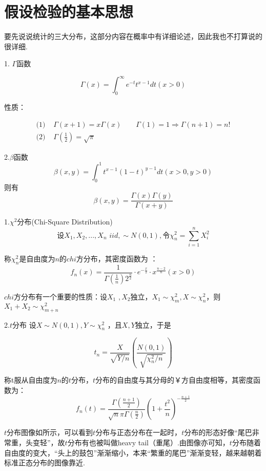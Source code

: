 \section{假设检验的基本思想}

要先说说统计的三大分布，这部分内容在概率中有详细论述，因此我也不打算说的很详细.

1. $\Gamma$函数

$$
\Gamma \left( x \right) =\int_0^{\infty}{e^{-t}t^{x-1}dt\left( x>0 \right)}
$$

性质：

\begin{align*}
    \text{(1) } & \Gamma \left( x+1 \right) =x\Gamma \left( x \right)  \qquad
    \Gamma \left( 1 \right) =1\Rightarrow \Gamma \left( n+1 \right) =n! \\
    \text{(2) } & \Gamma \left( \frac{1}{2} \right) =\sqrt{\pi}
\end{align*}


2.$\beta$函数
$$
\beta \left( x,y \right) =\int_0^1{t^{x-1}\left( 1-t \right) ^{y-1}dt\left( x>0,y>0 \right)}
$$
则有	 
$$
\beta \left( x,y \right) =\frac{\Gamma \left( x \right) \Gamma \left( y \right)}{\Gamma \left( x+y \right)}
$$

1.$\chi ^2$分布(Chi-Square Distribution)
$$
\text{设}X_1, X_2,..., X_n\,\,iid,\sim N\left( 0,1 \right) , \text{令}\chi _{n}^{2}=\sum_{i=1}^n{X_{i}^{2}}
$$

称$\chi _n^2$是自由度为$n$的$chi$方分布，其密度函数为 ：
$$
f_n\left( x \right) =\frac{1}{\Gamma \left( \frac{1}{n} \right) 2^{\frac{n}{2}}}\cdot e^{-\frac{x}{2}}\cdot x^{\frac{n-2}{n}}\left( x>0 \right) 
$$

$chi$方分布有一个重要的性质：设$X_1\,\,,X_2$独立，$X_1\sim \chi _{m}^{2}, X\sim \chi _{n}^{2}$，则$X_1+X_2\sim \chi _{m+n}^{2}$ 

2.$t$分布
设$X\sim N\left( 0,1 \right) , Y\sim \chi _{n}^{2}$ ，且$X,Y$独立，于是

$$
t_n=\frac{X}{\sqrt{Y/n}}\left( \frac{N\left( 0,1 \right)}{\sqrt{\chi _{n}^{2}/n}} \right) 
$$

称t服从自由度为$n$的$t$分布，$t$分布的自由度与其分母的￥方自由度相等，其密度函数为： 
$$
f_n\left( t \right) =\frac{\Gamma \left( \frac{n+1}{2} \right)}{\sqrt{n}\pi \Gamma \left( \frac{n}{2} \right)}\left( 1+\frac{t^2}{n} \right) ^{-\frac{n+1}{2}}
$$

$t$分布图像如所示，可以看到$t$分布与正态分布在一起时，$t$分布的形态好像“尾巴非常重，头变轻”，故$t$分布有也被叫做heavy tail（重尾）.由图像亦可知，$t$分布随着自由度的变大，“头上的鼓包”渐渐缩小，本来“繁重的尾巴”渐渐变轻，越来越朝着标准正态分布的图像靠近.

